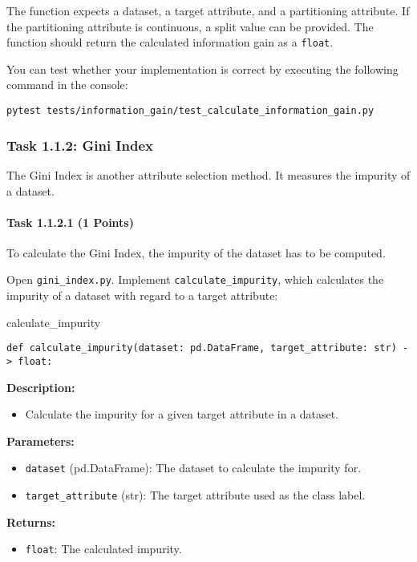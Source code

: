 \documentclass[
english,
smallborders
]{i6prcsht}
\newcommand{\points}[1]{\hfill \color{red}(#1 Points)\color{black}}
\begin{document}
\vspace*{0.5cm}

The function expects a dataset, a target attribute, and a partitioning attribute. If the partitioning attribute is continuous, a split value can be provided. The function should return the calculated information gain as a \texttt{float}.

You can test whether your implementation is correct by executing the following command in the console:

\vspace*{0.3cm}

\begin{lstlisting}
pytest tests/information_gain/test_calculate_information_gain.py
\end{lstlisting}

\newpage

\subsubsection*{Task 1.1.2: Gini Index}

The Gini Index is another attribute selection method. It measures the impurity of a dataset.

\paragraph*{Task 1.1.2.1 \points{1}} \hfill

To calculate the Gini Index, the impurity of the dataset has to be computed.

Open \texttt{gini\_index.py}. Implement \texttt{calculate\_impurity}, which calculates the impurity of a dataset with regard to a target attribute:

\vspace*{0.3cm}

\begin{functionbox}{calculate\_impurity}
	\begin{lstlisting}[numbers=none]
def calculate_impurity(dataset: pd.DataFrame, target_attribute: str) -> float:
\end{lstlisting}
	
	\textbf{Description:}
	\begin{itemize}[leftmargin=*,topsep=0pt]
		\item Calculate the impurity for a given target attribute in a dataset.
	\end{itemize}
	
	\textbf{Parameters:}
	\begin{itemize}[leftmargin=*,topsep=0pt]
		\item \texttt{dataset} (pd.DataFrame): The dataset to calculate the impurity for.
		\item \texttt{target\_attribute} (str): The target attribute used as the class label.
	\end{itemize}
	
	\textbf{Returns:}
	\begin{itemize}[leftmargin=*,topsep=0pt]
		\item \texttt{float}: The calculated impurity.
	\end{itemize}
\end{functionbox}
\end{document}

